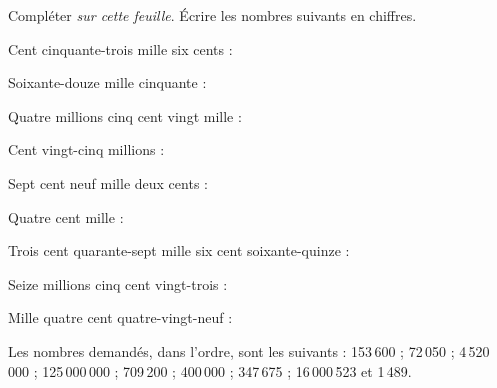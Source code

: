 Compléter \textit{sur cette feuille}.
\'Ecrire les nombres suivants en chiffres.
\begin{myenumerate}
    \item Cent cinquante-trois mille six cents : \dotfill
    \item Soixante-douze mille cinquante : \dotfill
    \item Quatre millions cinq cent vingt mille : \dotfill
    \item Cent vingt-cinq millions : \dotfill
    \item Sept cent neuf mille deux cents : \dotfill
    \item Quatre cent mille : \dotfill
    \item Trois cent quarante-sept mille six cent soixante-quinze
    : \dotfill
    \item Seize millions cinq cent vingt-trois : \dotfill
    \item Mille quatre cent quatre-vingt-neuf : \dotfill
\end{myenumerate}
Les nombres demandés, dans l'ordre, sont les suivants :
153\,600 ; 72\,050 ; 4\,520\,000 ; 125\,000\,000 ; 709\,200 ; 400\,000
; 347\,675 ; 16\,000\,523 et 1\,489.